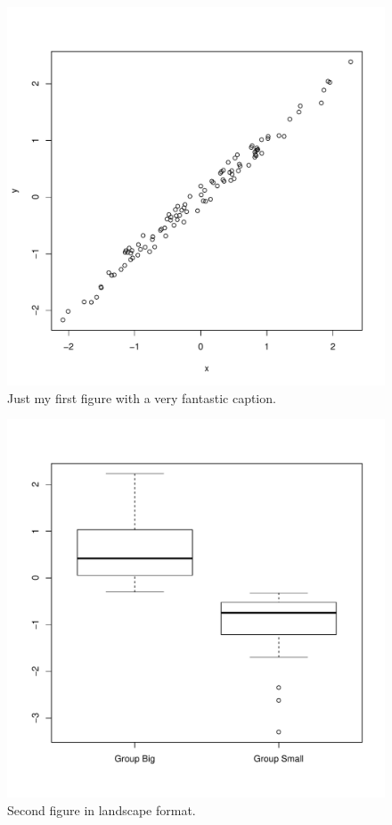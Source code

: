 \documentclass[11pt,a4paper]{article}
\newcommand{\blandscape}{\begin{landscape}}
\newcommand{\elandscape}{\end{landscape}}
\begin{document}
\clearpage

\listoffigures

\newpage

\begin{figure}
\centering
\includegraphics{figures/Fig1-1.pdf}
\caption{Just my first figure with a very fantastic caption.}
\end{figure}

\newpage

\blandscape

\begin{figure}
\centering
\includegraphics{figures/Fig2-1.pdf}
\caption{Second figure in landscape format.}
\end{figure}

\elandscape

\clearpage
\end{document}
